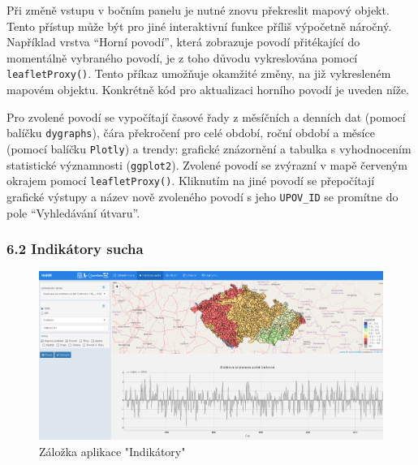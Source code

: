 \documentclass[12pt,]{article}
\newenvironment{Shaded}{\begin{snugshade}}{\end{snugshade}}
\newcommand{\KeywordTok}[1]{\textcolor[rgb]{0.13,0.29,0.53}{\textbf{#1}}}
\newcommand{\DataTypeTok}[1]{\textcolor[rgb]{0.13,0.29,0.53}{#1}}
\newcommand{\FloatTok}[1]{\textcolor[rgb]{0.00,0.00,0.81}{#1}}
\newcommand{\StringTok}[1]{\textcolor[rgb]{0.31,0.60,0.02}{#1}}
\newcommand{\OtherTok}[1]{\textcolor[rgb]{0.56,0.35,0.01}{#1}}
\newcommand{\OperatorTok}[1]{\textcolor[rgb]{0.81,0.36,0.00}{\textbf{#1}}}
\newcommand{\NormalTok}[1]{#1}
\begin{document}
\qquad Při změně vstupu v bočním panelu je nutné znovu překreslit mapový
objekt. Tento přístup může být pro jiné interaktivní funkce příliš
výpočetně náročný. Například vrstva \enquote{Horní povodí}, která
zobrazuje povodí přitékající do momentálně vybraného povodí, je z toho
důvodu vykreslována pomocí \texttt{leafletProxy()}. Tento příkaz
umožňuje okamžité změny, na již vykresleném mapovém objektu. Konkrétně
kód pro aktualizaci horního povodí je uveden níže.

\begin{Shaded}
\end{Shaded}

\qquad Pro zvolené povodí se vypočítají časové řady z měsíčních a
denních dat (pomocí balíčku \texttt{dygraphs}), čára překročení pro celé
období, roční období a měsíce (pomocí balíčku \texttt{Plotly}) a trendy:
grafické znázornění a tabulka s vyhodnocením statistické významnosti
(\texttt{ggplot2}). Zvolené povodí se zvýrazní v mapě červeným okrajem
pomocí \texttt{leafletProxy()}. Kliknutím na jiné povodí se přepočítají
grafické výstupy a název nově zvoleného povodí s jeho \texttt{UPOV\_ID}
se promítne do pole \enquote{Vyhledávání útvaru}.

\subsubsection{6.2 Indikátory sucha}\label{indikatory-sucha}

\begin{figure}[H]
      \includegraphics[width=\textwidth]{fig/P_indikatory}
      \caption{Záložka aplikace "Indikátory"}
      \label{fig:ch5.4}
\end{figure}
\end{document}
